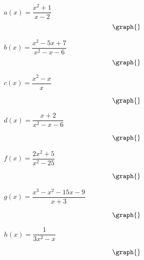 \documentclass{ximera}
\begin{document}
\begin{question}
$a(x) = \dfrac{x^2+1}{x-2}$
\[
\graph{}
\]
\begin{selectAll}
\end{selectAll}

$b(x) = \dfrac{x^2-5x+7}{x^2-x-6}$
\[
\graph{}
\]

\begin{selectAll}
\end{selectAll}

$c(x) = \dfrac{x^2-x}{x}$

\[
\graph{}
\]

\begin{selectAll}
\end{selectAll}

$d(x) = \dfrac{x+2}{x^2-x-6}$

\[
\graph{}
\]

\begin{selectAll}
\end{selectAll}

$f(x) = \dfrac{2x^2+5}{x^2-25}$

\[
\graph{}
\]

\begin{selectAll}
\end{selectAll}

$g(x) = \dfrac{x^3-x^2-15x-9}{x+3}$

\[
\graph{}
\]

\begin{selectAll}
\end{selectAll}

$h(x) = \dfrac{1}{3x^2-x}$

\[
\graph{}
\]

\begin{selectAll}
\end{selectAll}
\end{question}
\end{document}
